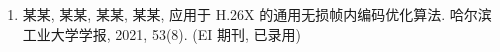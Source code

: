 \begin{publications}
    \begin{enumerate}
        \item 某某, 某某, 某某, 某某,
              应用于 H.26X 的通用无损帧内编码优化算法.
              哈尔滨工业大学学报, 2021, 53(8). (EI 期刊, 已录用)

    \end{enumerate}

\end{publications}
